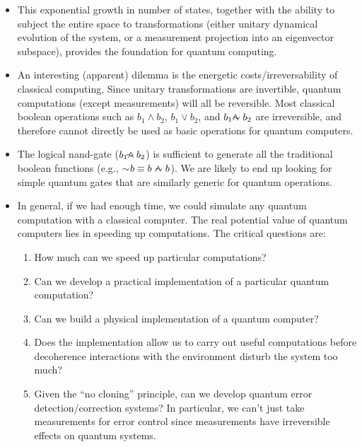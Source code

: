 \documentclass{article}
\def\pagedone{\newpage}
\def\lnandb{\land\negthickspace\negthickspace\negmedspace\negthinspace\sim}
\def\lnandc{\land\negthickspace\negthickspace\negmedspace\negthinspace\negthinspace\sim}
\begin{document}
\pagedone
{}
\begin{itemize}

	\item This exponential growth in number of states, together with the ability to subject the entire space to transformations (either unitary dynamical evolution of the system, or a measurement projection into an eigenvector subspace), provides the foundation for quantum computing.
	\item An interesting (apparent) dilemma is the energetic costs/irreversability of classical computing.  Since unitary transformations are invertible, quantum computations (except measurements) will all be reversible.  Most classical boolean operations such as $b_1\land b_2$, $b_1\lor b_2$, and $b_1\lnandb b_2$ are irreversible, and therefore cannot directly be used as basic operations for quantum computers.

\end{itemize}



\pagedone

\begin{itemize}

	\item The logical nand-gate ($b_1\lnandc b_2$) is sufficient to generate all the traditional boolean functions (e.g., $\sim\negmedspace b \equiv b\ \lnandb b$).  We are likely to end up looking for simple quantum gates that are similarly generic for quantum operations.

	\item In general, if we had enough time, we could simulate any quantum computation with a classical computer.  The real potential value of quantum computers lies in speeding up computations.  The critical questions are:

	\begin{enumerate}
		\item How much can we speed up particular computations?
		\item Can we develop a practical implementation of a particular quantum computation?
		\item Can we build a physical implementation of a quantum computer?  
		\item Does the implementation allow us to carry out useful computations before decoherence interactions with the environment disturb the system too much?
		\item Given the ``no cloning'' principle, can we develop quantum error detection/correction systems? In particular, we can't just take measurements for error control since measurements have irreversible effects on quantum systems.	  
	\end{enumerate}


\end{itemize}
\end{document}
